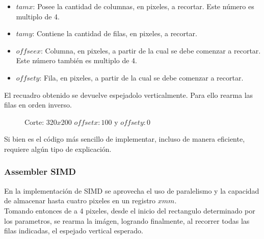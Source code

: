 \begin{itemize}
\item{$tamx$: Posee la cantidad de columnas, en pixeles, a recortar. Este número es multiplo de 4.}
\item{$tamy$: Contiene la cantidad de filas, en pixeles, a recortar.}
\item{$offseex$: Columna, en pixeles, a partir de la cual se debe comenzar a recortar. Este número también es multiplo de 4.}
\item{$offsety$: Fila, en pixeles, a partir de la cual se debe comenzar a recortar.}
\end{itemize}

El recuadro obtenido se devuelve espejadolo verticalmente. Para ello rearma las filas en orden inverso.\\

\begin{figure}
  \centering
  \hfill
  \caption{Corte: 320$x$200 $offset x: 100$ y $offset y: 0$}
\end{figure}

Si bien es el código más sencillo de implementar, incluso de manera eficiente, requiere algún tipo de explicación.

\subsubsection{Assembler SIMD}

En la implementación de SIMD se aprovecha el uso de paralelismo y la capacidad de almacenar hasta cuatro pixeles en un registro $xmm$.\\ 
Tomando entonces de a 4 pixeles, desde el inicio del rectangulo determinado por los parametros, se rearma la imágen, logrando finalmente, al recorrer todas las filas indicadas, el espejado vertical esperado.


